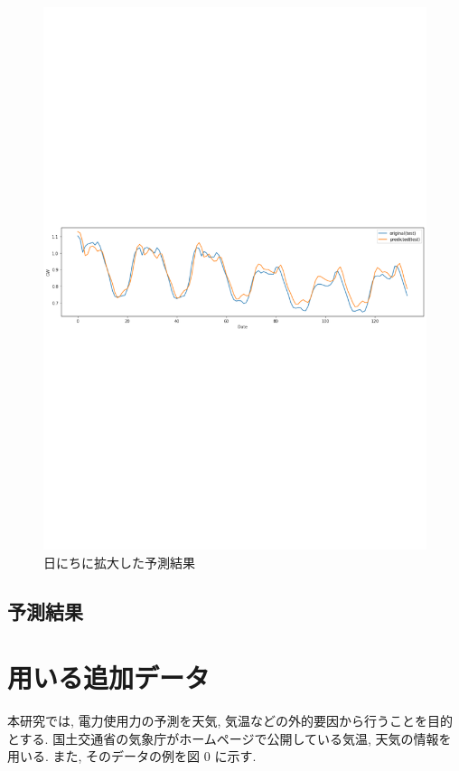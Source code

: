 \begin{figure}[phb]
\begin{center}
\includegraphics[scale=0.8]{lstm_pred_day.pdf}
 \caption{日にちに拡大した予測結果}
\end{center}
\end{figure}

\subsection{予測結果}

\section{用いる追加データ}
本研究では, 電力使用力の予測を天気, 気温などの外的要因から行うことを目的とする.
国土交通省の気象庁がホームページで公開している気温, 天気の情報を用いる.
また, そのデータの例を図 0 に示す.

